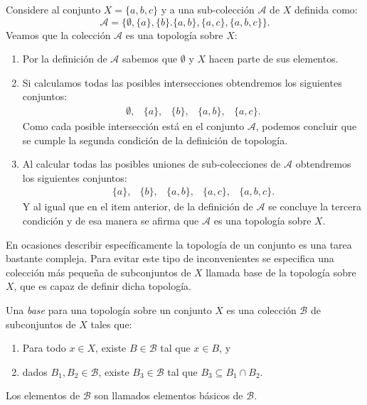 \begin{example}\label{ex:exBase}
Considere al conjunto $X=\{a,b,c\}$ y a una sub-colección $\mathcal{A}$ de $X$ definida como: 
$$\mathcal{A}=\{\emptyset,\{a\},\{b\}.\{a,b\},\{a,c\},\{a,b,c\}\}.$$
Veamos que la colección $\mathcal{A}$ es una topología sobre $X$:
\begin{enumerate}
    \item Por la definición de $\mathcal{A}$ sabemos que $\emptyset$ y $X$ hacen parte de sus elementos.
    \item Si calculamos todas las posibles intersecciones obtendremos los siguientes conjuntos:
    $$\begin{array}{cccccc}
        \emptyset, & \{a\}, & \{b\}, & \{a,b\}, & \{a,c\}.
    \end{array}$$
    Como cada posible intersección está en el conjunto $\mathcal{A}$, podemos concluir que se cumple la segunda condición de la definición de topología.
    \item Al calcular todas las posibles uniones de sub-colecciones de $\mathcal{A}$ obtendremos los siguientes conjuntos:
    $$\begin{array}{cccccc}
        \{a\}, & \{b\}, & \{a,b\}, & \{a,c\}, & \{a,b,c\}.
    \end{array}$$
    Y al igual que en el item anterior, de la definición de $\mathcal{A}$ se concluye la tercera condición y de esa manera se afirma que $\mathcal{A}$ es una topología sobre $X$.
\end{enumerate}
\end{example}

En ocasiones describir específicamente la topología de un conjunto es una tarea bastante compleja. Para evitar este tipo de inconvenientes se especifica una colección más pequeña de subconjuntos de $X$ llamada base de la topología sobre $X$, que es capaz de definir dicha topología. 

\begin{definition}\label{def:base}
Una \textit{base} para una topología sobre un conjunto $X$ es una colección $\mathcal{B}$ de subconjuntos de $X$ tales que:
\begin{enumerate}
    \item Para todo $x\in X$, existe $B\in\mathcal{B}$ tal que $x\in B$, y
    \item dados $B_1,B_2\in\mathcal{B}$, existe $B_3\in\mathcal{B}$ tal que $B_3\subseteq B_1\cap B_2$.
\end{enumerate}
Los elementos de $\mathcal{B}$ son llamados elementos básicos de $\mathcal{B}$.
\end{definition}


